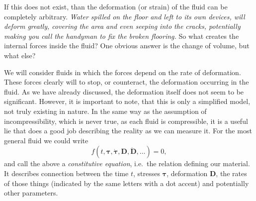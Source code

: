\documentclass[a4paper]{article}
\begin{document}
If this  does not exist, than the deformation (or strain)
of the fluid can be completely arbitrary. \emph{Water spilled on the floor and
left to its own devices, will deform greatly, covering the area and even
seeping into the cracks, potentially making you call the handyman to fix the
broken flooring.} So what creates the internal forces inside the fluid? One
obvious answer is the change of volume, but what else?

We will consider fluids in which the forces depend on the rate of deformation.
These forces clearly will  to stop, or counteract, the deformation
occurring in the fluid. As we have already discussed, the deformation itself
does not seem to be significant. However, it is important to note, that this is
only a simplified model, not truly existing in nature. In the same way as the
assumption of incompressibility, which is never true, as each fluid is
compressible, it is a useful lie that does a good job describing the reality as
we can measure it. For the most general fluid we could write
\[
	f(t, \bm{\tau}, \dot{\bm{\tau}}, \bm{D}, \dot{\bm{D}}, \dots) = 0,
\]
and call the above a \emph{constitutive equation}, i.e.\ the relation defining
our material. It describes connection between the time \(t\), stresses
\(\bm{\tau}\), deformation \(\bm{D}\), the rates of those things (indicated by
the same letters with a dot accent) and potentially other parameters.
\end{document}
